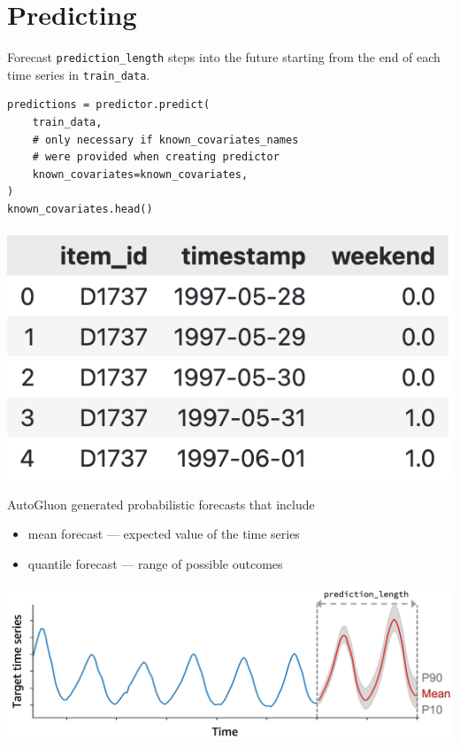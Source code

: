 \vfill\null
\columnbreak

\section*{Predicting}
Forecast \texttt{prediction\_length} steps into the future starting from the end of each time series in \texttt{train\_data}.
\begin{verbatim}
predictions = predictor.predict(
    train_data,
    # only necessary if known_covariates_names
    # were provided when creating predictor
    known_covariates=known_covariates,
)
known_covariates.head()
\end{verbatim}
\vspace{-5mm}
\begin{center}
\includegraphics[width=0.4\linewidth]{timeseries/images/future_known_covariates.png}
\end{center}

\medskip

AutoGluon generated probabilistic forecasts that include
\begin{itemize}
    \item mean forecast --- expected value of the time series
    \item quantile forecast --- range of possible outcomes
\end{itemize}

\begin{center}
\includegraphics[width=\linewidth]{timeseries/images/probabilistic_forecast.png}
\end{center}

